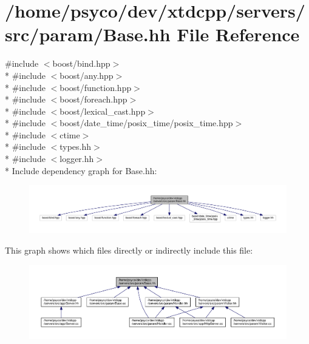 \hypertarget{Base_8hh}{}\section{/home/psyco/dev/xtdcpp/servers/src/param/\+Base.hh File Reference}
\label{Base_8hh}
{\ttfamily \#include $<$boost/bind.\+hpp$>$}\\*
{\ttfamily \#include $<$boost/any.\+hpp$>$}\\*
{\ttfamily \#include $<$boost/function.\+hpp$>$}\\*
{\ttfamily \#include $<$boost/foreach.\+hpp$>$}\\*
{\ttfamily \#include $<$boost/lexical\+\_\+cast.\+hpp$>$}\\*
{\ttfamily \#include $<$boost/date\+\_\+time/posix\+\_\+time/posix\+\_\+time.\+hpp$>$}\\*
{\ttfamily \#include $<$ctime$>$}\\*
{\ttfamily \#include $<$types.\+hh$>$}\\*
{\ttfamily \#include $<$logger.\+hh$>$}\\*
Include dependency graph for Base.\+hh\+:
\nopagebreak
\begin{figure}[H]
\begin{center}
\leavevmode
\includegraphics[width=350pt]{Base_8hh__incl}
\end{center}
\end{figure}
This graph shows which files directly or indirectly include this file\+:
\nopagebreak
\begin{figure}[H]
\begin{center}
\leavevmode
\includegraphics[width=350pt]{Base_8hh__dep__incl}
\end{center}
\end{figure}
